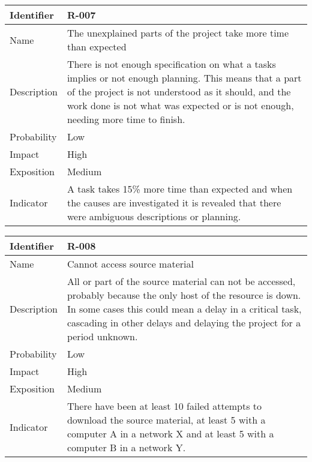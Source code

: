 \begin{table}[H]
	\begin{tabularx}{\textwidth}{|l|X|}
		\hline
		\rowcolor{gray!30}
		Identifier & \textbf{R-007} \\ \hline
		Name & The unexplained parts of the project take more time than expected\\ \hline
		Description & There is not enough specification on what a tasks implies or not enough planning. This means that a part of the project is not understood as it should, and the work done is not what was expected or is not enough, needing more time to finish. \\ \hline
		Probability & Low\\ \hline
		Impact &  High\\ \hline
		Exposition &  Medium\\ \hline
		Indicator & A task takes 15\% more time than expected and when the causes are investigated it is revealed that there were ambiguous descriptions or planning.\\ \hline
	\end{tabularx}
\end{table}
\begin{table}[H]
	\begin{tabularx}{\textwidth}{|l|X|}
		\hline
		\rowcolor{gray!30}
		Identifier & \textbf{R-008} \\ \hline
		Name & Cannot access source material\\ \hline
		Description & All or part of the source material can not be accessed, probably because the only host of the resource is down. In some cases this could mean a delay in a critical task, cascading in other delays and delaying the project for a period unknown.\\ \hline
		Probability & Low\\ \hline
		Impact & High\\ \hline
		Exposition & Medium\\ \hline
		Indicator & There have been at least 10 failed attempts to download the source material, at least 5 with a computer A in a network X and at least 5 with a computer B in a network Y.\\ \hline
	\end{tabularx}
\end{table}
